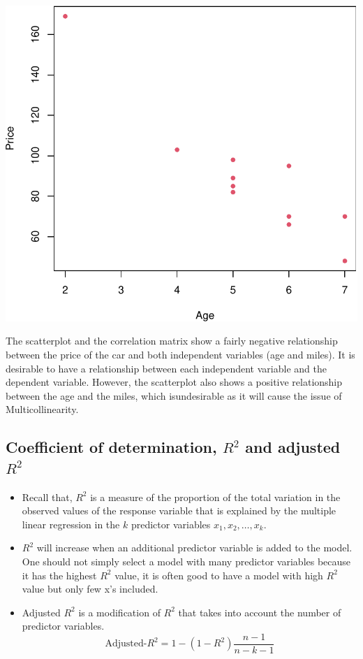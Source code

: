 \documentclass[
]{article}
\begin{document}
\begin{center}\includegraphics[width=0.7\linewidth,height=0.7\textheight]{unnamed-chunk-75-1} \end{center}

The scatterplot and the correlation matrix show a fairly negative
relationship between the price of the car and both independent variables
(age and miles). It is desirable to have a relationship between each
independent variable and the dependent variable. However, the
scatterplot also shows a positive relationship between the age and the
miles, which isundesirable as it will cause the issue of
Multicollinearity.

\hypertarget{coefficient-of-determination-r2-and-adjusted-r2}{%
\subsection{\texorpdfstring{Coefficient of determination, \(R^2\) and
adjusted
\(R^2\)}{Coefficient of determination, R\^{}2 and adjusted R\^{}2}}\label{coefficient-of-determination-r2-and-adjusted-r2}}

\begin{itemize}
\item
  Recall that, \(R^2\) is a measure of the proportion of the total
  variation in the observed values of the response variable that is
  explained by the multiple linear regression in the \(k\) predictor
  variables \(x_1, x_2, \ldots, x_k\).
\item
  \(R^2\) will increase when an additional predictor variable is added
  to the model. One should not simply select a model with many predictor
  variables because it has the highest \(R^2\) value, it is often good
  to have a model with high \(R^2\) value but only few x's included.
\item
  Adjusted \(R^2\) is a modification of \(R^2\) that takes into account
  the number of predictor variables.
  \[\mbox{Adjusted-}R^2=1-(1-R^2)\frac{n-1}{n-k-1}\]
\end{itemize}
\end{document}
